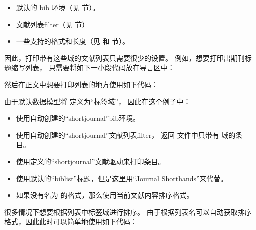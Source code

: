 \begin{ltxsyntax}
\begin{itemize}
\item %
默认的 bib 环境（见  节）。
\item %
文献列表filter（见  节）
\item %
一些支持的格式和长度（见  和  节）。
\end{itemize}
%
因此，打印带有这些域的文献列表只需要很少的设置。
例如，想要打印出期刊标题缩写列表，
只需要将如下一小段代码放在导言区中：

\begin{ltxexample}
\end{ltxexample}
%
然后在正文中想要打印列表的地方使用如下代码：

\begin{ltxexample}
\end{ltxexample}
%
由于默认数据模型将  定义为“标签域”，
因此在这个例子中：
\begin{itemize}
\item %
使用自动创建的“shortjournal”bib环境。
\item %
使用自动创建的“shortjournal”文献列表filter，
返回  文件中只带有  域的条目。
\item %
使用定义的“shortjournal”文献驱动来打印条目。
\item %
使用默认的“biblist”标题，但是这里用“Journal Shorthands”来代替。
\item %
如果没有名为  的格式，那么使用当前文献内容排序格式。
\end{itemize}
%
很多情况下想要根据列表中标签域进行排序。
由于根据列表名可以自动获取排序格式，因此此时可以简单地使用如下代码：


\end{ltxsyntax}
